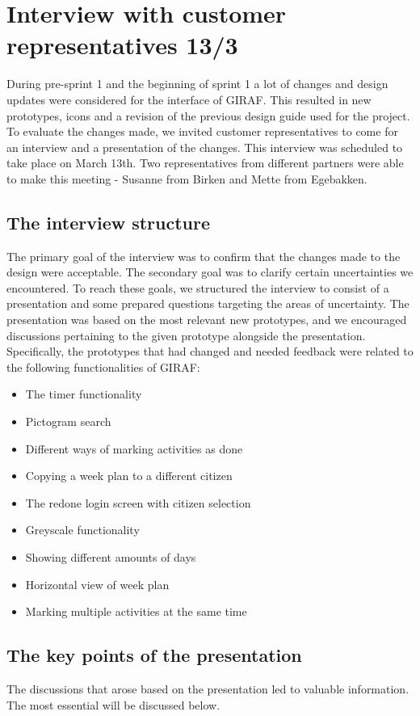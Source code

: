 \section{Interview with customer representatives 13/3}\label{interview13/3}
During pre-sprint 1 and the beginning of sprint 1 a lot of changes and design updates were considered for the interface of GIRAF.
This resulted in new prototypes, icons and a revision of the previous design guide used for the project.
To evaluate the changes made, we invited customer representatives to come for an interview and a presentation of the changes.
This interview was scheduled to take place on March 13th.
Two representatives from different partners were able to make this meeting - Susanne from Birken and Mette from Egebakken.

\subsection{The interview structure}
The primary goal of the interview was to confirm that the changes made to the design were acceptable. 
The secondary goal was to clarify certain uncertainties we encountered. 
To reach these goals, we structured the interview to consist of a presentation and some prepared questions targeting the areas of uncertainty.
The presentation was based on the most relevant new prototypes, and we encouraged discussions pertaining to the given prototype alongside the presentation.
Specifically, the prototypes that had changed and needed feedback were related to the following functionalities of GIRAF:
\begin{itemize}
    \item The timer functionality
    \item Pictogram search
    \item Different ways of marking activities as done
    \item Copying a week plan to a different citizen
    \item The redone login screen with citizen selection
    \item Greyscale functionality
    \item Showing different amounts of days
    \item Horizontal view of week plan
    \item Marking multiple activities at the same time
\end{itemize}

\subsection{The key points of the presentation}
The discussions that arose based on the presentation led to valuable information. The most essential will be discussed below.

